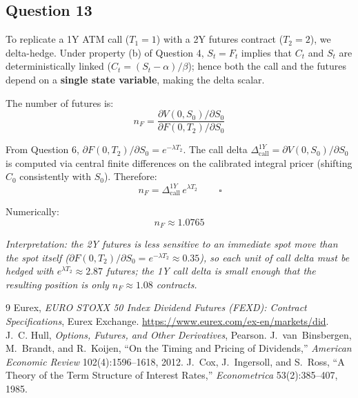 \documentclass[12pt,a4paper]{article}
\begin{document}
\subsection*{Question 13}

To replicate a 1Y ATM call ($T_1 = 1$) with a 2Y futures contract ($T_2 = 2$), we delta-hedge. Under property (b) of Question 4, $S_t = F_t$ implies that $C_t$ and $S_t$ are deterministically linked ($C_t = (S_t - \alpha)/\beta$); hence both the call and the futures depend on a \textbf{single state variable}, making the delta scalar.

The number of futures is:
\begin{equation*}
    n_F = \frac{\partial V(0, S_0)/\partial S_0}{\partial F(0, T_2)/\partial S_0}
\end{equation*}

From Question 6, $\partial F(0, T_2)/\partial S_0 = e^{-\lambda T_2}$. The call delta $\Delta_{\mathrm{call}}^{1Y} = \partial V(0, S_0)/\partial S_0$ is computed via central finite differences on the calibrated integral pricer (shifting $C_0$ consistently with $S_0$). Therefore:
\begin{equation*}
    \boxed{\,n_F = \Delta_{\mathrm{call}}^{1Y}\,e^{\lambda T_2}\,} \qquad \square
\end{equation*}

Numerically:
\begin{equation*}
    n_F \approx 1.0765
\end{equation*}

\textit{Interpretation: the 2Y futures is less sensitive to an immediate spot move than the spot itself ($\partial F(0,T_2)/\partial S_0 = e^{-\lambda T_2} \approx 0.35$), so each unit of call delta must be hedged with $e^{\lambda T_2} \approx 2.87$ futures; the 1Y call delta is small enough that the resulting position is only $n_F \approx 1.08$ contracts.}

\begin{thebibliography}{9}\footnotesize
{} Eurex, \emph{EURO STOXX 50 Index Dividend Futures (FEXD): Contract Specifications}, Eurex Exchange. \url{https://www.eurex.com/ex-en/markets/did}.
 J.~C. Hull, \emph{Options, Futures, and Other Derivatives}, Pearson.
 J.~van~Binsbergen, M.~Brandt, and R.~Koijen, ``On the Timing and Pricing of Dividends,'' \emph{American Economic Review} 102(4):1596--1618, 2012.
 J.~Cox, J.~Ingersoll, and S.~Ross, ``A Theory of the Term Structure of Interest Rates,'' \emph{Econometrica} 53(2):385--407, 1985.
\end{thebibliography}
\end{document}

